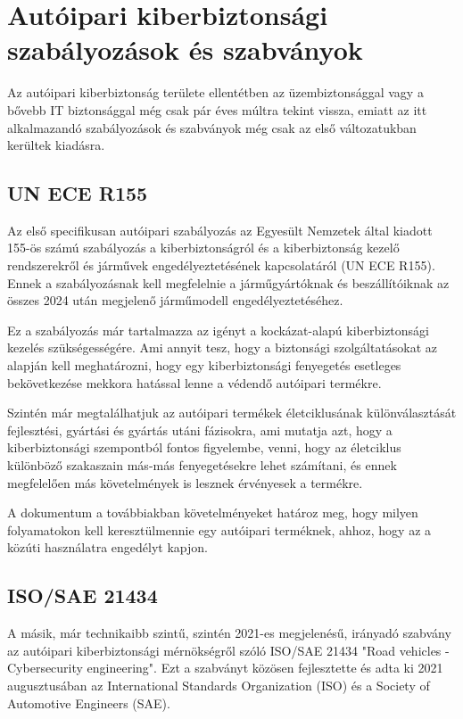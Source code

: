 \section{Autóipari kiberbiztonsági szabályozások és szabványok}

Az autóipari kiberbiztonság területe ellentétben az üzembiztonsággal vagy a bővebb IT biztonsággal még csak pár éves múltra tekint vissza, emiatt az itt alkalmazandó szabályozások és szabványok még csak az első változatukban kerültek kiadásra. 

\subsection{UN ECE R155}
Az első specifikusan autóipari szabályozás az Egyesült Nemzetek által kiadott 155-ös számú szabályozás a kiberbiztonságról és a kiberbiztonság kezelő rendszerekről és járművek engedélyeztetésének kapcsolatáról (UN ECE R155\cite{R155}). Ennek a szabályozásnak kell megfelelnie a járműgyártóknak és beszállítóiknak az összes 2024 után megjelenő járműmodell engedélyeztetéséhez.

Ez a szabályozás már tartalmazza az igényt a kockázat-alapú kiberbiztonsági kezelés szükségességére. Ami annyit tesz, hogy a biztonsági szolgáltatásokat az alapján kell meghatározni, hogy egy kiberbiztonsági fenyegetés esetleges bekövetkezése mekkora hatással lenne a védendő autóipari termékre.

Szintén már megtalálhatjuk az autóipari termékek életciklusának különválasztását fejlesztési, gyártási és gyártás utáni fázisokra, ami mutatja azt, hogy a kiberbiztonsági szempontból fontos figyelembe, venni, hogy az életciklus különböző szakaszain más-más fenyegetésekre lehet számítani, és ennek megfelelően más követelmények is lesznek érvényesek a termékre.

A dokumentum a továbbiakban követelményeket határoz meg, hogy milyen folyamatokon kell keresztülmennie egy autóipari terméknek, ahhoz, hogy az a közúti használatra engedélyt kapjon. 

\subsection{ISO/SAE 21434}

A másik, már technikaibb szintű, szintén 2021-es megjelenésű, irányadó szabvány az autóipari kiberbiztonsági mérnökségről szóló ISO/SAE 21434 "Road vehicles - Cybersecurity engineering". Ezt a szabványt közösen fejlesztette és adta ki 2021 augusztusában az International Standards Organization (ISO) és a Society of Automotive Engineers (SAE).

